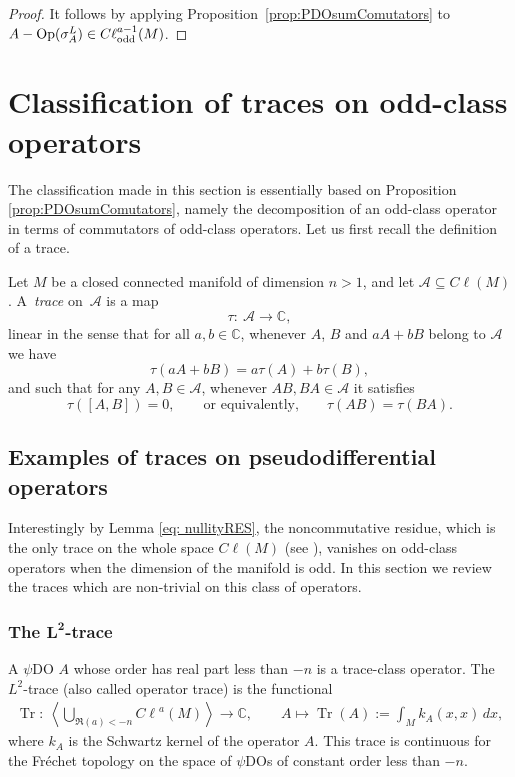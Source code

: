 \documentclass[11pt]{article}
\DeclareMathOperator{\Tr}{Tr} \DeclareMathOperator{\ord}{ord}
\DeclareMathOperator{\odd}{odd} \DeclareMathOperator{\supp}{supp}
\newcommand{\C}{{\mathbb C}}
\def \Cl {{C\ell}}
\begin{document}
\begin{proof}
It follows by applying Proposition~\ref{prop:PDOsumComutators} to $A-\Op(\sigma_A^L)\in \Cl^{a-1}_{\odd}(M)$.
\end{proof}

\section{Classif\/ication of traces on odd-class operators}\label{sectiontraces}

The classif\/ication made in this section is essentially based on Proposition \ref{prop:PDOsumComutators}, namely the decomposition of an odd-class operator in terms of commutators of odd-class operators. Let us f\/irst recall the def\/inition of a trace.

Let $M$ be a closed connected manifold of dimension $n>1$, and let $\mathcal{A}\subseteq\Cl(M)$. A~\emph{trace} on~$\mathcal{A}$ is a map
\[
\tau: \ \mathcal{A}\rightarrow\mathbb{C},
\]
linear in the sense that for all $a, b\in\C$, whenever $A$, $B$ and $aA+bB$ belong to $\mathcal{A}$ we have
\[
\tau(aA+bB)=a \tau(A)+b \tau(B),
\]
and such that for any $A,B\in\mathcal{A}$, whenever $AB,BA\in\mathcal{A}$ it satisf\/ies
\[
\tau([A,B])=0,\qquad \text{or equivalently,} \qquad \tau(AB)=\tau(BA).
\]

\subsection{Examples of traces on pseudodif\/ferential operators}

Interestingly by Lemma \ref{eq: nullityRES}, the noncommutative residue, which is the only trace on the whole space $\Cl(M)$ (see \cite{fedosov,lesch,wodzicki}), vanishes on odd-class operators when the dimension of the manifold is odd. In this section we review the traces which are non-trivial on this class of operators.

\subsubsection[The $L^2$-trace]{The $\boldsymbol{L^2}$-trace}\label{sectionL2trace}

A $\psi$DO $A$ whose order has real part less than $-n$ is a trace-class operator. The $L^2$-trace (also called operator trace) is the functional
\begin{gather}
\Tr:\ \left\langle\bigcup\limits_{\Re(a)<-n}\Cl^{a}(M)\right\rangle \to\mathbb{C},\qquad
A \mapsto\Tr(A):=\int_{M}k_A(x,x)\,dx, \label{TrL2kernel}
\end{gather}
where $k_A$ is the Schwartz kernel of the operator $A$. This trace is continuous for the Fr\'echet topology on the space of $\psi$DOs of constant order less than $-n$.
\end{document}
